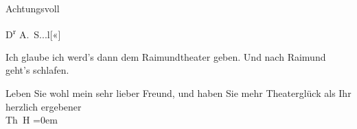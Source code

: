 \pstart
           \centering{}Achtungsvoll\pend
           
\pstart
           \raggedleft{}D\textsuperscript{r} A. S...l{[}«{]}\pend
           
\pstart
           {\pb}Ich glaube ich werd’s dann dem Raimundtheater geben. Und nach Raimund geht’s schlafen.\pend
           
\pstart
           Leben Sie wohl mein sehr lieber Freund, und haben Sie mehr Theaterglück als Ihr {\\[\baselineskip]}herzlich ergebener {\\[\baselineskip]}\spacefill\mbox{Th H}\pend
           \leftskip=0em{}\endnumbering{}
\begin{anhang}
\end{anhang}\newcommand{\dateiname}{L03847}\newcommand{\titel}{Theodor Herzl an Arthur Schnitzler, 1. 2. 1895}\newcommand{\editorInnen}{Selma Jahnke und Martin Anton Müller}

